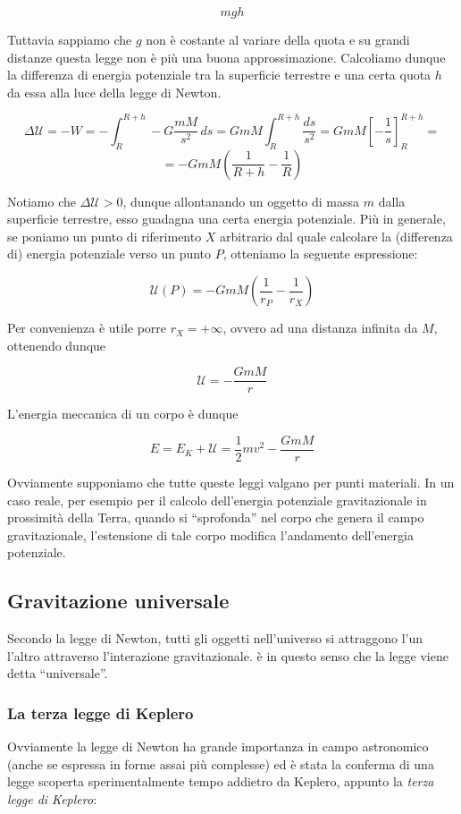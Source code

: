 \[ mgh \]

\noindent Tuttavia sappiamo che $g$ non è costante al variare della quota e su grandi
distanze questa legge non è più una buona approssimazione. Calcoliamo dunque la differenza
di energia potenziale tra la superficie terrestre e una certa quota $h$ da essa alla luce
della legge di Newton.

\[ \Delta\mathcal{U} = -W = -\int_{R}^{R + h}-G\frac{mM}{s^2}\,ds = GmM\int_{R}^{R+h}\frac{ds}{s^2} = GmM\left[ -\frac{1}{s} \right]_{R}^{R+h} =  \]
\[ = -GmM\left( \frac{1}{R + h} - \frac{1}{R} \right) \]

\noindent Notiamo che $\Delta\mathcal{U} > 0$, dunque allontanando un oggetto di massa
$m$ dalla superficie terrestre, esso guadagna una certa energia potenziale. Più in generale,
se poniamo un punto di riferimento $X$ arbitrario dal quale calcolare la (differenza di)
energia potenziale verso un punto $P$, otteniamo la seguente espressione:

\[ \mathcal{U}(P) = -GmM\left(\frac{1}{r_P} - \frac{1}{r_X}\right) \]

\noindent Per convenienza è utile porre $r_X = +\infty$, ovvero ad una distanza infinita da
$M$, ottenendo dunque

\[ \mathcal{U} = -\frac{GmM}{r} \]

\noindent L'energia meccanica di un corpo è dunque

\[ E = E_K + \mathcal{U} = \frac{1}{2}mv^2 -\frac{GmM}{r} \]

\noindent Ovviamente supponiamo che tutte queste leggi valgano per punti materiali.
In un caso reale, per esempio per il calcolo dell'energia potenziale gravitazionale
in prossimità della Terra, quando si ``sprofonda'' nel corpo che genera il campo
gravitazionale, l'estensione di tale corpo modifica l'andamento dell'energia potenziale.

\subsection{Gravitazione universale}
Secondo la legge di Newton, tutti gli oggetti nell'universo si attraggono l'un l'altro
attraverso l'interazione gravitazionale. è in questo senso che la legge viene detta
``universale''.

\subsubsection*{La terza legge di Keplero}
Ovviamente la legge di Newton ha grande importanza in campo astronomico (anche
se espressa in forme assai più complesse) ed è stata la conferma di una legge scoperta
sperimentalmente tempo addietro da Keplero, appunto la \textit{terza legge di Keplero}:

